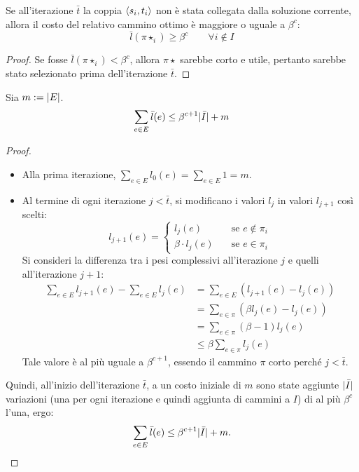 \begin{lemma}\label{lem:priceddpaths_non_included_non_short}
	Se all'iterazione $\bar t$ la coppia $\langle s_i,t_i \rangle$ non è stata collegata dalla soluzione corrente, allora il costo del relativo cammino ottimo è maggiore o uguale a $\beta^c$:
	\begin{equation*}
		\bar l(\pi\star_i)\geq\beta^c\qquad\forall i\notin I
	\end{equation*}
\end{lemma}
\begin{proof}
	Se fosse $\bar l(\pi\star_i)<\beta^c$, allora $\pi\star$ sarebbe corto e utile, pertanto sarebbe stato selezionato prima dell'iterazione $\bar t$.
\end{proof}

\begin{lemma}\label{lem:priceddpaths_sum_l_a_leq_bc_i_m}
	Sia $m:=| E |$.
	\begin{equation*}
		\sum_{e\in E}\bar l(e) \leq \beta^{c+1}| \bar I | + m
	\end{equation*}
\end{lemma}
\begin{proof}~
	\begin{itemize}
		\item Alla prima iterazione, $\sum_{e\in E} l_0(e) = \sum_{e\in E} 1 = m$.
		\item Al termine di ogni iterazione $j<\bar t$, si modificano i valori $l_j$ in valori $l_{j+1}$ così scelti:
		      \begin{equation*}
			      l_{j+1}(e) =
			      \begin{cases}
				      l_j(e)            & \quad\text{se } e\notin\pi_i \\
				      \beta\cdot l_j(e) & \quad\text{se } e\in\pi_i
			      \end{cases}
		      \end{equation*}
		      Si consideri la differenza tra i pesi complessivi all'iterazione $j$ e quelli all'iterazione $j+1$:
		      \begin{align*}
			      \sum_{e\in E} l_{j+1}(e) - \sum_{e\in E} l_j(e) & = \sum_{e\in E} (l_{j+1}(e)-l_j(e))   \\
			                                                      & = \sum_{e\in\pi}(\beta l_j(e)-l_j(e)) \\
			                                                      & = \sum_{e\in\pi} (\beta-1)l_j(e)      \\
			                                                      & \leq \beta\sum_{e\in\pi}l_j(e)
		      \end{align*}
		      Tale valore è al più uguale a $\beta^{c+1}$, essendo il cammino $\pi$ corto perché $j<\bar t$.
	\end{itemize}
	Quindi, all'inizio dell'iterazione $\bar t$, a un costo iniziale di $m$ sono state aggiunte $| \bar I |$ variazioni (una per ogni iterazione e quindi aggiunta di cammini a $I$) di al più $\beta^c$ l'una, ergo:
	\begin{equation*}
		\sum_{e\in E} \bar l(e) \leq \beta^{c+1}| \bar I |+m \text.
	\end{equation*}
\end{proof}

